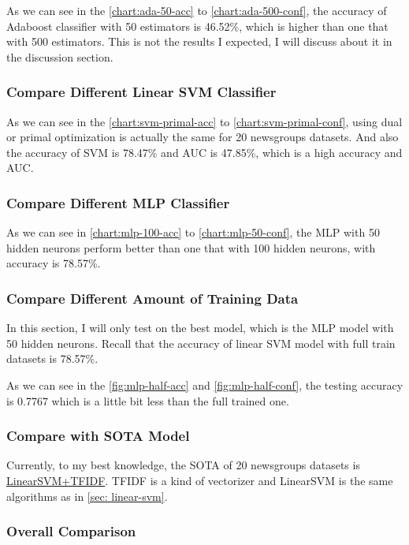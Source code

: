 \documentclass[twocolumn]{extarticle}
\begin{document}
As we can see in the \autoref{chart:ada-50-acc} to \autoref{chart:ada-500-conf}, the accuracy of Adaboost classifier with 50 estimators is 46.52\%, which is higher than one that with 500 estimators. This is not the results I expected, I will discuss about it in the discussion section.

\subsubsection{Compare Different Linear SVM Classifier}

As we can see in the \autoref{chart:svm-primal-acc} to \autoref{chart:svm-primal-conf}, using dual or primal optimization is actually the same for 20 newsgroups datasets. And also the accuracy of SVM is 78.47\% and AUC is 47.85\%, which is a high accuracy and AUC.

\subsubsection{Compare Different MLP Classifier}

As we can see in \autoref{chart:mlp-100-acc} to \autoref{chart:mlp-50-conf}, the MLP with 50 hidden neurons perform better than one that with 100 hidden neurons, with accuracy is 78.57\%. 

\subsubsection{Compare Different Amount of Training Data}

In this section, I will only test on the best model, which is the MLP model with 50 hidden neurons. Recall that the accuracy of linear SVM model with full train datasets is 78.57\%.

As we can see in the \autoref{fig:mlp-half-acc} and \autoref{fig:mlp-half-conf}, the testing accuracy is 0.7767 which is a little bit less than the full trained one.

\subsubsection{Compare with SOTA Model}

Currently, to my best knowledge, the SOTA of 20 newsgroups datasets is \href{https://arxiv.org/abs/2211.02563v1}{LinearSVM+TFIDF}. TFIDF is a kind of vectorizer and LinearSVM is the same algorithms as in \ref{sec: linear-svm}.

\subsubsection{Overall Comparison}
\end{document}
